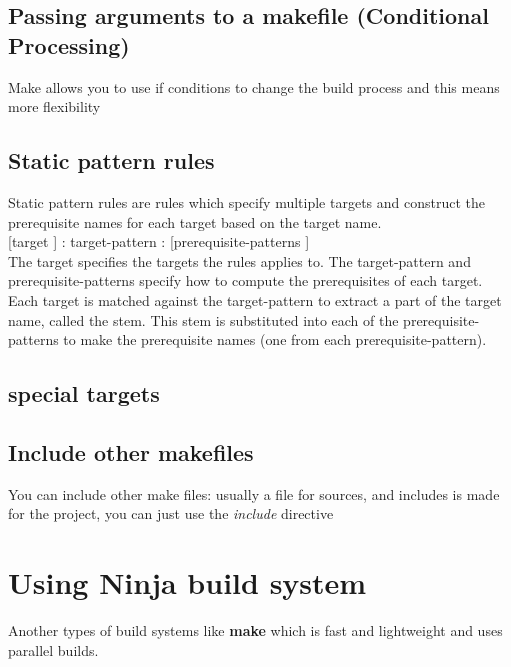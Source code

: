 \documentclass{article}
\begin{document}
\subsection{Passing arguments to a makefile (Conditional Processing)}
Make allows you to use if conditions to change the build process and this means more flexibility



\subsection{Static pattern rules}
Static pattern rules are rules which specify multiple targets and construct the prerequisite names for each
target based on the target name.\\

{[target ]} : target-pattern : {[prerequisite-patterns ]}\\

The target specifies the targets the rules applies to. The target-pattern and prerequisite-patterns specify
how to compute the prerequisites of each target. Each target is matched against the target-pattern to
extract a part of the target name, called the stem. This stem is substituted into each of the
prerequisite-patterns to make the prerequisite names (one from each prerequisite-pattern).




\subsection{special targets}

\subsection{Include other makefiles}
You can include other make files: usually a file for sources, and includes is made for the project, you can just use the \textit{include} directive

\section{Using Ninja build system}
Another types of build systems like \textbf{make} which is fast and lightweight and uses parallel builds.\\
\end{document}
